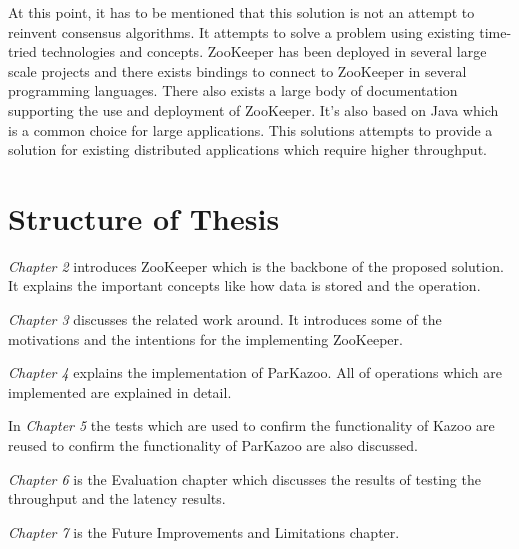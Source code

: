 At this point, it has to be mentioned that this solution is not an attempt to reinvent consensus algorithms. It attempts to solve a problem using existing time-tried technologies and concepts. ZooKeeper has been deployed in several large scale projects and there exists bindings to connect to ZooKeeper in several programming languages. There also exists a large body of documentation supporting the use and deployment of ZooKeeper. It's also based on Java which is a common choice for large applications. This solutions attempts to provide a solution for existing distributed applications which require higher throughput.

\section{Structure of Thesis}

\textit{Chapter 2} introduces ZooKeeper which is the backbone of the proposed solution. It explains the important concepts like how data is stored and the operation.

\textit{Chapter 3} discusses the related work around. It introduces some of the motivations and the intentions for the implementing ZooKeeper.

\textit{Chapter 4} explains the implementation of ParKazoo. All of operations which are implemented are explained in detail.

In \textit{Chapter 5} the tests which are used to confirm the functionality of Kazoo are reused to confirm the functionality of ParKazoo are also discussed.

\textit{Chapter 6} is the Evaluation chapter which discusses the results of testing the throughput and the latency results.

\textit{Chapter 7} is the Future Improvements and Limitations chapter.
